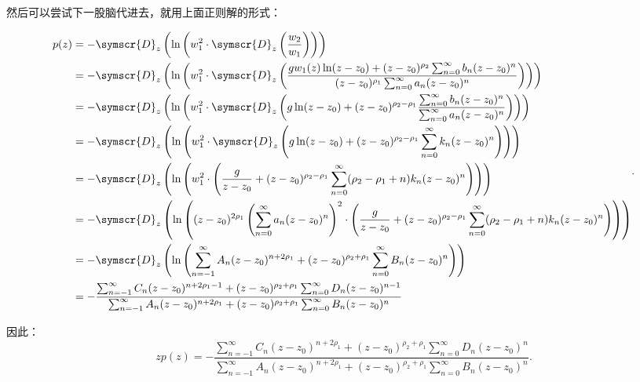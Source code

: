 然后可以尝试下一股脑代进去，就用上面正则解的形式：


\[
	\begin{aligned}
		p(z) & =-\symscr{D} _z\left( \ln \left( w_1^2\cdot \symscr{D} _z\left(  \frac{w_2}{w_1} \right)  \right)  \right)                                                                                                                                   \\
		     & =-\symscr{D} _z\left( \ln \left( w_1^2\cdot \symscr{D} _z\left(  \frac{gw_1(z)\ln (z-z_0)+(z-z_0)^{\rho _2}\sum_{n=0}^{\infty} b_n (z-z_0)^n}{(z-z_0)^{\rho _1}\sum_{n=0}^{\infty} a_n (z-z_0)^n} \right)  \right)  \right)                  \\
		     & =-\symscr{D} _z\left( \ln \left( w_1^2\cdot \symscr{D} _z\left( g \ln (z-z_0)+ (z-z_0)^{\rho _2-\rho _1}\frac{\sum_{n=0}^{\infty} b_n (z-z_0)^n}{\sum_{n=0}^{\infty} a_n (z-z_0)^n} \right)  \right)  \right)                                \\
		     & =-\symscr{D} _z\left( \ln \left( w_1^2\cdot \symscr{D} _z\left( g \ln (z-z_0)+ (z-z_0)^{\rho _2-\rho _1} \sum_{n=0}^{\infty} k_n (z-z_0)^n \right)  \right)  \right)                                                                         \\
		     & =-\symscr{D} _z\left( \ln \left( w_1^2\cdot \left( \frac{g}{z-z_0}+ (z-z_0)^{\rho _2-\rho _1} \sum_{n=0}^{\infty} (\rho _2-\rho _1+n)k_n (z-z_0)^n \right)  \right)  \right)                                                                 \\
		     & =-\symscr{D} _z\left( \ln \left( (z-z_0)^{2\rho _1}\left( \sum_{n=0}^{\infty} a_n (z-z_0)^n \right)^2 \cdot \left( \frac{g}{z-z_0}+ (z-z_0)^{\rho _2-\rho _1} \sum_{n=0}^{\infty} (\rho _2-\rho _1+n)k_n (z-z_0)^n \right)  \right)  \right) \\
		     & =-\symscr{D} _z\left( \ln \left( \sum_{n=-1}^{\infty} A_n (z-z_0)^{n+2\rho _1}  + (z-z_0)^{\rho _2+\rho _1} \sum_{n=0}^{\infty}B_n(z-z_0)^n \right)  \right)                                                                                 \\
		     & =- \frac{\sum_{n=-1}^{\infty} C_n (z-z_0)^{n+2\rho _1-1}  + (z-z_0)^{\rho _2+\rho _1} \sum_{n=0}^{\infty}D_n(z-z_0)^{n-1}}{\sum_{n=-1}^{\infty} A_n (z-z_0)^{n+2\rho _1}  + (z-z_0)^{\rho _2+\rho _1} \sum_{n=0}^{\infty}B_n(z-z_0)^n}
	\end{aligned}
	.\]

因此：
\[
	zp(z)=- \frac{\sum_{n=-1}^{\infty} C_n (z-z_0)^{n+2\rho _1}  + (z-z_0)^{\rho _2+\rho _1} \sum_{n=0}^{\infty}D_n(z-z_0)^{n}}{\sum_{n=-1}^{\infty} A_n (z-z_0)^{n+2\rho _1}  + (z-z_0)^{\rho _2+\rho _1} \sum_{n=0}^{\infty}B_n(z-z_0)^n}
	.\]

